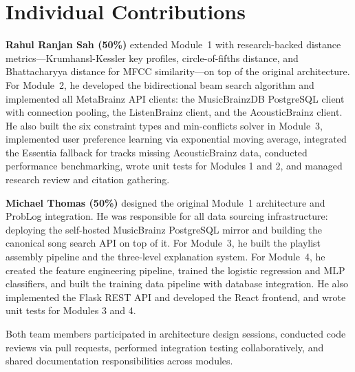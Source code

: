\section{Individual Contributions}

\textbf{Rahul Ranjan Sah (50\%)} extended Module~1 with research-backed distance metrics---Krumhansl-Kessler key profiles, circle-of-fifths distance, and Bhattacharyya distance for MFCC similarity---on top of the original architecture. For Module~2, he developed the bidirectional beam search algorithm and implemented all MetaBrainz API clients: the MusicBrainzDB PostgreSQL client with connection pooling, the ListenBrainz client, and the AcousticBrainz client. He also built the six constraint types and min-conflicts solver in Module~3, implemented user preference learning via exponential moving average, integrated the Essentia fallback for tracks missing AcousticBrainz data, conducted performance benchmarking, wrote unit tests for Modules 1 and 2, and managed research review and citation gathering.

\textbf{Michael Thomas (50\%)} designed the original Module~1 architecture and ProbLog integration. He was responsible for all data sourcing infrastructure: deploying the self-hosted MusicBrainz PostgreSQL mirror and building the canonical song search API on top of it. For Module~3, he built the playlist assembly pipeline and the three-level explanation system. For Module~4, he created the feature engineering pipeline, trained the logistic regression and MLP classifiers, and built the training data pipeline with database integration. He also implemented the Flask REST API and developed the React frontend, and wrote unit tests for Modules 3 and 4.

Both team members participated in architecture design sessions, conducted code reviews via pull requests, performed integration testing collaboratively, and shared documentation responsibilities across modules.
